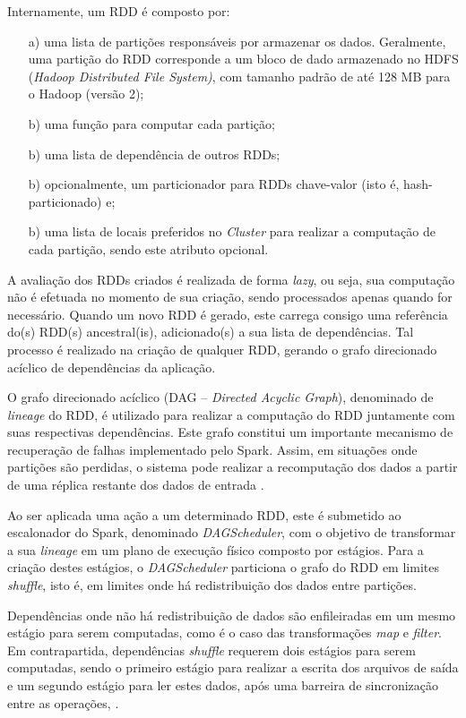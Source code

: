 Internamente, um RDD é composto por:
\begin{itemize}
    \item[a)] uma lista de partições responsáveis por armazenar os dados. Geralmente, uma partição do RDD corresponde a um bloco de dado armazenado no HDFS (\textit{Hadoop Distributed File System)}, com tamanho padrão de até 128 MB para o Hadoop (versão 2);
    \item[b)] uma função para computar cada partição;
    \item[b)] uma lista de dependência de outros RDDs;
    \item[b)] opcionalmente, um particionador para RDDs chave-valor (isto é, hash-particionado) e;
    \item[b)] uma lista de locais preferidos no \textit{Cluster} para realizar a computação de cada partição, sendo este atributo opcional.
\end{itemize}

A avaliação dos RDDs criados é realizada de forma \textit{lazy}, ou seja, sua computação não é efetuada no momento de sua criação, sendo processados apenas quando for necessário. Quando um novo RDD é gerado, este carrega consigo uma referência do(s) RDD(s) ancestral(is), adicionado(s) a sua lista de dependências. Tal processo é realizado na criação de qualquer RDD, gerando o grafo direcionado acíclico de dependências da aplicação.

O grafo direcionado acíclico (DAG -- \textit{Directed Acyclic Graph}), denominado de \textit{lineage} do RDD, é utilizado para realizar a computação do RDD juntamente com suas respectivas dependências. Este grafo constitui um importante mecanismo de recuperação de falhas implementado pelo Spark. Assim, em situações onde partições são perdidas, o sistema pode realizar a recomputação dos dados a partir de uma réplica restante dos dados de entrada \cite{karau2015learning}.

Ao ser aplicada uma ação a um determinado RDD, este é submetido ao escalonador do Spark, denominado \textit{DAGScheduler}, com o objetivo de transformar a sua \textit{lineage} em um plano de execução físico composto por estágios. Para a criação destes estágios, o \textit{DAGScheduler} particiona o grafo do RDD em limites \textit{shuffle}, isto é, em limites onde há redistribuição dos dados entre partições. 

Dependências onde não há redistribuição de dados são enfileiradas em um mesmo estágio para serem computadas, como é o caso das transformações \textit{map} e \textit{filter}. Em contrapartida, dependências \textit{shuffle} requerem dois estágios para serem computadas, sendo o primeiro estágio para realizar a escrita dos arquivos de saída e um segundo estágio para ler estes dados, após uma barreira de sincronização entre as operações, \cite{DAGSchedulerSpark}. 

